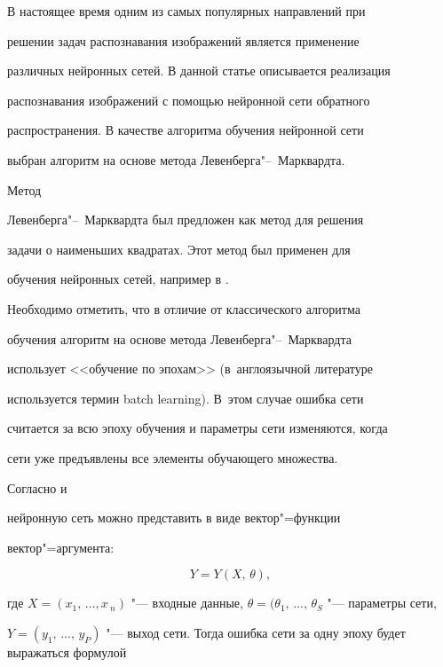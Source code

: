 В настоящее время одним из самых популярных направлений при

решении задач распознавания изображений является применение

различных нейронных сетей. В данной статье описывается реализация

распознавания изображений с помощью нейронной сети обратного

распространения. В качестве алгоритма обучения нейронной сети

выбран алгоритм на основе метода Левенберга"--~Марквардта.



\smallskip



 Метод

Левенберга"--~Марквардта был предложен как метод для решения

задачи о наименьших квадратах. Этот метод был применен для

обучения нейронных сетей, например в \cite{afertsev:Hagan}.

Необходимо отметить, что в отличие от классического алгоритма

обучения алгоритм на основе метода Левенберга"--~Марквардта

использует <<обучение по эпохам>> (в~англоязычной литературе

используется термин batch learning). В~этом случае ошибка сети

считается за всю эпоху обучения и параметры сети изменяются, когда

сети уже предъявлены все элементы обучающего множества.



Согласно \cite{afertsev:Hagan} и \cite{afertsev:Wilamowski}

нейронную сеть можно представить в виде вектор"=функции

вектор"=аргумента:

\begin{equation}

\label{fertsev:eq4}

Y = Y (X,\,\theta),

\end{equation}

где $X=(x_1,\,\dots,x\,_n)$  "--- входные данные, $\theta =(\theta_1,\,\dots,\,\theta_S$ "--- параметры сети,

$Y=(y_1,\,\dots,\,y_P)$ "--- выход сети. Тогда ошибка сети за одну эпоху будет выражаться формулой



